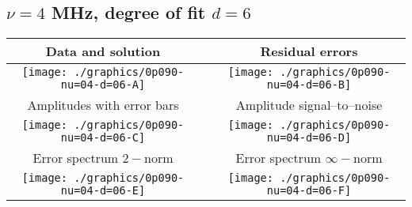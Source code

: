 

% 

\clearpage{}
\break{}

\subsection{$\nu = 4$ MHz, degree of fit $d = 6$}

\begin{table}[h]
    \begin{center}
        \begin{tabular}{ccc}
            Data and solution & \quad & Residual errors \\\hline
            \texttt{[image: ./graphics/0p090-nu=04-d=06-A]} &&
            \texttt{[image: ./graphics/0p090-nu=04-d=06-B]} \\[15pt]
            Amplitudes with error bars && Amplitude signal--to--noise \\\hline
            \texttt{[image: ./graphics/0p090-nu=04-d=06-C]} &&
            \texttt{[image: ./graphics/0p090-nu=04-d=06-D]} \\[15pt]
            Error spectrum $2-$norm && Error spectrum $\infty-$norm \\\hline
            \texttt{[image: ./graphics/0p090-nu=04-d=06-E]} &&
            \texttt{[image: ./graphics/0p090-nu=04-d=06-F]} \\[15pt]
        \end{tabular}
    \end{center}
\label{fig:elev=90, nu=4}
\end{table}



\endinput
